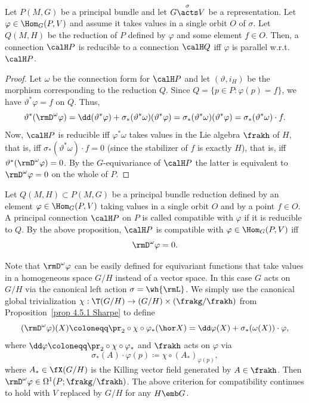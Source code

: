 \begin{prop}[{{\cite[Prop.~1.6.10]{RS2}}}]\label{prop 1.6.10 RS2}
    Let $P(M,G)$ be a principal bundle and let $G\overset{\sigma}{\acts}V$ be a representation. Let $\varphi\in\Hom_G(P,V)$ and assume it takes values in a single orbit $O$ of $\sigma$. Let $Q(M,H)$ be the reduction of $P$ defined by $\varphi$ and some element $f\in O$. Then, a connection $\calH P$ is reducible to a connection $\calH Q$ iff $\varphi$ is parallel w.r.t.\ $\calH P$.
\end{prop}
\begin{proof}
    Let $\omega$ be the connection form for $\calH P$ and let $(\vartheta,i_H)$ be the morphism corresponding to the reduction $Q$. Since $Q=\{p\in P:\varphi(p)=f\}$, we have $\vartheta^\ast \varphi=f$ on $Q$. Thus,
    \[\vartheta^\ast(\rmD^\omega\varphi)=\dd (\vartheta^\ast \varphi)+\sigma_\ast(\vartheta^\ast\omega)(\vartheta^\ast\varphi)=\sigma_\ast(\vartheta^\ast\omega)(\vartheta^\ast\varphi)=\sigma_\ast(\vartheta^\ast\omega)\cdot f.\]
    Now, $\calH P$ is reducible iff $\varphi^\ast\omega$ takes values in the Lie algebra $\frakh$ of $H$, that is, iff $\sigma_\ast(\vartheta^\ast\omega)\cdot f=0$ (since the stabilizer of $f$ is exactly $H$), that is, iff $\vartheta^\ast(\rmD^\omega\varphi)=0$. By the $G$-equivariance of $\calH P$ the latter is equivalent to $\rmD^\omega \varphi=0$ on the whole of $P$.
\end{proof}


\begin{defn}\label{def compatible connection}
    Let $Q(M,H)\subset P(M,G)$ be a principal bundle reduction defined by an element $\varphi\in \Hom_G(P,V)$ taking values in a single orbit $O$ and by a point $f\in O$. A principal connection $\calH P$ on $P$ is called compatible with $\varphi$ if it is reducible to $Q$. By the above proposition, $\calH P$ is compatible with $\varphi\in\Hom_G(P,V)$ iff
    \[\rmD^\omega\varphi=0.\]
\end{defn}

\begin{rem}\label{rem generalized covariant D}
    Note that $\rmD^\omega \varphi$ can be easily defined for equivariant functions that take values in a homogeneous space $G\slash H$ instead of a vector space. In this case $G$ acts on $G\slash H$ via the canonical left action $\sigma=\wh{\rmL}$. We simply use the canonical global trivialization $\chi:\T(G\slash H)\to (G\slash H)\times(\frakg\slash\frakh)$ from Proposition~\ref{prop 4.5.1 Sharpe} to define
    \[(\rmD^\omega{\varphi})(X)\coloneqq \pr_2\circ \chi\circ \varphi_\ast(\hor X)=\dd \varphi(X)+\sigma_\ast(\omega(X))\cdot {\varphi},\]
    where $\dd \varphi\coloneqq \pr_2\circ\chi\circ \varphi_\ast $ and $\frakh$ acts on $\varphi$ via 
    \[\sigma_\ast(A)\cdot \varphi(p)\coloneqq \chi\circ (A_{\ast})_{\varphi(p)},\]
    where $A_\ast\in\fX(G\slash H)$ is the Killing vector field generated by $A\in\frakh$. Then $\rmD^\omega {\varphi}\in \Omega^1(P;\frakg\slash\frakh)$. The above criterion for compatibility continues to hold with $V$ replaced by $G\slash H$ for any $H\emb G$.
\end{rem}







